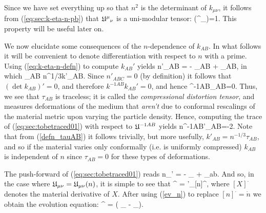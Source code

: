 Since we have set everything up so that $n^2$ is the determinant of $k_{\mu\nu}$, it follows from (\ref{eq:sec:k-eta-n-pb}) that ${\mathfrak{U}^{\mu}}_{\nu}$ is a uni-modular tensor:
\bea
\det({\unimod^{\mu}}_{\nu})=1.
\eea 
This property will be useful later on.

We now elucidate some consequences of the $n$-dependence of $k_{ AB}$.
In what follows it will be convenient to denote differentiation with respect to $n$ with a prime. Using (\ref{eq:k-eta-n-defn}) to compute $k_{ AB}'$ yields
\bea
\label{eq:sec:tobetraced01}
n\unimod'_{AB} = - \unimod_{AB} + \tau_{AB},
\eea
in which
\bea
\label{defn_tauAB}
\tau_{AB}  n^{1/3}k'_{AB}.
\eea
Since $n'_{ABC}=0$ (by definition) it follows that $(\det k_{ AB})'=0$, and therefore $k^{-1AB}k_{AB }'=0$, and hence
\bea
\unimod^{-1AB}\tau_{AB}=0.
\eea
Thus, we see that $\tau_{AB}$ is   traceless; it is called the \textit{compressional distortion tensor}, and measures   deformations of the medium that \textit{aren't} due to conformal rescalings of the material metric upon varying the particle density.
Hence, computing the trace of (\ref{eq:sec:tobetraced01}) with respect to $\mathfrak{U}^{-1AB}$ yields
\bea
n\unimod^{-1AB}\unimod'_{AB}=-2.
\eea
Note that from (\ref{defn_tauAB}) it follows trivially, but more usefully, $k'_{AB} = n^{-1/3}\tau_{AB}$, and so if the material varies only  conformally (i.e. is uniformly compressed) $k_{ AB}$ is independent of $n$ since $\tau_{AB}=0$ for these types of deformations.


The push-forward of (\ref{eq:sec:tobetraced01}) reads
\bea
n\unimod_{\mu\nu}' = - \unimod_{\mu\nu} + \tau_{ab}.
\eea
And so, in the case where $\mathfrak{U}_{\mu\nu} = \mathfrak{U}_{\mu\nu}(n)$, it is simple to see that
\bea
[{\unimod}_{\mu\nu}]^{\cdot} = \unimod'_{\mu\nu}[n]^{\cdot},
\eea
where $[X]^{\cdot}$ denotes the material derivative of $X$. After using (\ref{ev_n}) to replace $[n]^{\cdot}=\dot{n}$ we obtain the evolution equation:
\bea
[{\unimod}_{\mu\nu}]^{\cdot} =  \left( \unimod_{\mu\nu} - \tau_{\mu\nu}\right)\Theta.
\eea



